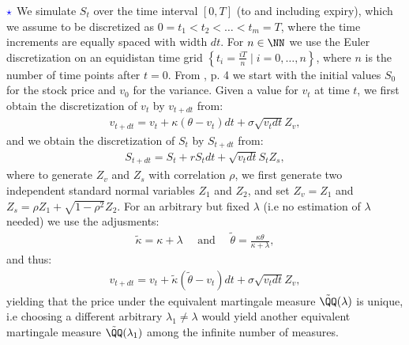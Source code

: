 \documentclass[12pt]{article}
\numberwithin{equation}{section}
\newcommand{\lc}{\left\{}
\newcommand{\rc}{\right\}}
\begin{document}
$\textcolor{blue}{\star}$ We simulate $S_t$ over the time interval $[0, T]$ (to
and including expiry),
which we assume to be discretized as $0 = t_1 < t_2 < \ldots < t_m = T$, where
the time increments are equally spaced with width $d t$. For $n\in\NN$ we use
the Euler discretization on an equidistan time grid $\lc t_i=\frac{iT}{n}\mid
i=0,\ldots,n\rc$, where $n$ is the number of time points after $t=0$. From
\cite{Rouah2024}, p. 4 we start with the initial
values $S_0$ for the stock price and $v_0$ for the variance. Given a value for
$v_t$ at time $t$, we first obtain the discretization of $v_t$ by $v_{t+dt}$ from:
\begin{align*}
    v_{t+dt} = v_t + \kappa(\theta - v_t)dt + \sigma \sqrt{v_t dt}Z_v,
\end{align*}
and we obtain the discretization of $S_t$ by $S_{t+dt}$ from:
\begin{align*}
    S_{t+dt} = S_t + rS_tdt + \sqrt{v_t dt}S_tZ_s,
\end{align*}
where to generate $Z_v$ and $Z_s$ with correlation $\rho$, we first generate two independent standard normal variables $Z_1$ and $Z_2$, and set $Z_v = Z_1$ and $Z_s = \rho Z_1 + \sqrt{1 - \rho^2} Z_2$.
For an arbitrary but fixed $\lambda$ (i.e no estimation of $\lambda$ needed) we use the adjusments:
\begin{align*}
    \tilde{\kappa}=\kappa+\lambda \quad \text{ and } \quad \tilde{\theta}=\frac{\kappa\theta}{\kappa + \lambda},
\end{align*}
and thus:
\begin{align*}
    v_{t+dt} = v_t +\tilde{\kappa}(\tilde{\theta} - v_t)dt + \sigma \sqrt{v_t dt}Z_v,
\end{align*}
yielding that the price under the equivalent martingale measure
$\tilde{\QQ}(\lambda)$ is unique, i.e choosing a different arbitrary
$\lambda_1\neq \lambda$ would yield another equivalent martingale measure
$\tilde{\QQ}(\lambda_1)$ among the infinite number of measures.
\end{document}
